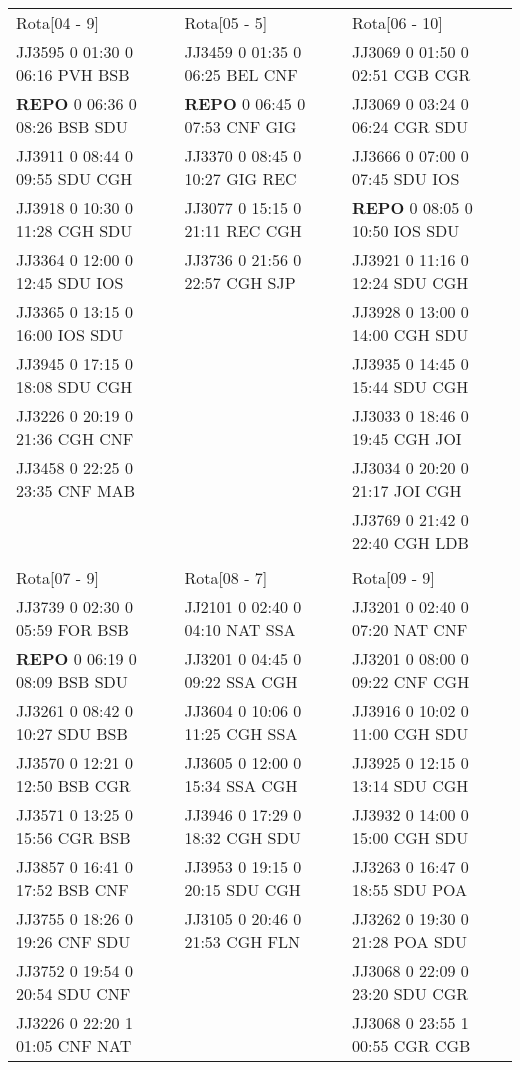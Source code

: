 \begin{scriptsize}
\begin{longtable}{l l l}
Rota[04 - 9]  & Rota[05 - 5]  & Rota[06 - 10] \\
JJ3595 0 01:30 0 06:16 PVH BSB & JJ3459 0 01:35 0 06:25 BEL CNF & JJ3069 0 01:50 0 02:51 CGB CGR\\
\textbf{REPO}   0 06:36 0 08:26 BSB SDU & \textbf{REPO}   0 06:45 0 07:53 CNF GIG & JJ3069 0 03:24 0 06:24 CGR SDU\\
JJ3911 0 08:44 0 09:55 SDU CGH & JJ3370 0 08:45 0 10:27 GIG REC & JJ3666 0 07:00 0 07:45 SDU IOS\\
JJ3918 0 10:30 0 11:28 CGH SDU & JJ3077 0 15:15 0 21:11 REC CGH & \textbf{REPO}   0 08:05 0 10:50 IOS SDU\\
JJ3364 0 12:00 0 12:45 SDU IOS & JJ3736 0 21:56 0 22:57 CGH SJP & JJ3921 0 11:16 0 12:24 SDU CGH\\
JJ3365 0 13:15 0 16:00 IOS SDU & & JJ3928 0 13:00 0 14:00 CGH SDU\\
JJ3945 0 17:15 0 18:08 SDU CGH & & JJ3935 0 14:45 0 15:44 SDU CGH\\
JJ3226 0 20:19 0 21:36 CGH CNF & & JJ3033 0 18:46 0 19:45 CGH JOI\\
JJ3458 0 22:25 0 23:35 CNF MAB & & JJ3034 0 20:20 0 21:17 JOI CGH\\
 &  & JJ3769 0 21:42 0 22:40 CGH LDB\\

& & \\

Rota[07 - 9]  & Rota[08 - 7]  & Rota[09 - 9] \\
JJ3739 0 02:30 0 05:59 FOR BSB & JJ2101 0 02:40 0 04:10 NAT SSA & JJ3201 0 02:40 0 07:20 NAT CNF\\
\textbf{REPO}   0 06:19 0 08:09 BSB SDU & JJ3201 0 04:45 0 09:22 SSA CGH & JJ3201 0 08:00 0 09:22 CNF CGH\\
JJ3261 0 08:42 0 10:27 SDU BSB & JJ3604 0 10:06 0 11:25 CGH SSA & JJ3916 0 10:02 0 11:00 CGH SDU\\
JJ3570 0 12:21 0 12:50 BSB CGR & JJ3605 0 12:00 0 15:34 SSA CGH & JJ3925 0 12:15 0 13:14 SDU CGH\\
JJ3571 0 13:25 0 15:56 CGR BSB & JJ3946 0 17:29 0 18:32 CGH SDU & JJ3932 0 14:00 0 15:00 CGH SDU\\
JJ3857 0 16:41 0 17:52 BSB CNF & JJ3953 0 19:15 0 20:15 SDU CGH & JJ3263 0 16:47 0 18:55 SDU POA\\
JJ3755 0 18:26 0 19:26 CNF SDU & JJ3105 0 20:46 0 21:53 CGH FLN & JJ3262 0 19:30 0 21:28 POA SDU\\
JJ3752 0 19:54 0 20:54 SDU CNF & & JJ3068 0 22:09 0 23:20 SDU CGR\\
JJ3226 0 22:20 1 01:05 CNF NAT & & JJ3068 0 23:55 1 00:55 CGR CGB\\


\end{longtable}
\end{scriptsize}
